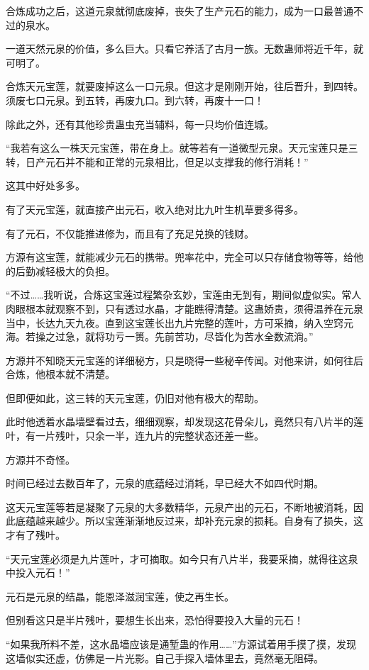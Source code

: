 \begin{this_body}
合炼成功之后，这道元泉就彻底废掉，丧失了生产元石的能力，成为一口最普通不过的泉水。

一道天然元泉的价值，多么巨大。只看它养活了古月一族。无数蛊师将近千年，就可明了。

合炼天元宝莲，就要废掉这么一口元泉。但这才是刚刚开始，往后晋升，到四转。须废七口元泉。到五转，再废九口。到六转，再废十一口！

除此之外，还有其他珍贵蛊虫充当辅料，每一只均价值连城。

“我若有这么一株天元宝莲，带在身上。就等若有一道微型元泉。天元宝莲只是三转，日产元石并不能和正常的元泉相比，但足以支撑我的修行消耗！”

这其中好处多多。

有了天元宝莲，就直接产出元石，收入绝对比九叶生机草要多得多。

有了元石，不仅能推进修为，而且有了充足兑换的钱财。

方源有这宝莲，就能减少元石的携带。兜率花中，完全可以只存储食物等等，给他的后勤减轻极大的负担。

“不过……我听说，合炼这宝莲过程繁杂玄妙，宝莲由无到有，期间似虚似实。常人肉眼根本就观察不到，只有透过水晶，才能瞧得清楚。这蛊娇贵，须得温养在元泉当中，长达九天九夜。直到这宝莲长出九片完整的莲叶，方可采摘，纳入空窍元海。若操之过急，就将功亏一篑。先前苦功，尽皆化为苦水全数流淌。”

方源并不知晓天元宝莲的详细秘方，只是晓得一些秘辛传闻。对他来讲，如何往后合炼，他根本就不清楚。

但即便如此，这三转的天元宝莲，仍旧对他有极大的帮助。

此时他透着水晶墙壁看过去，细细观察，却发现这花骨朵儿，竟然只有八片半的莲叶，有一片残叶，只余一半，连九片的完整状态还差一些。

方源并不奇怪。

时间已经过去数百年了，元泉的底蕴经过消耗，早已经大不如四代时期。

这天元宝莲等若是凝聚了元泉的大多数精华，元泉产出的元石，不断地被消耗，因此底蕴越来越少。所以宝莲渐渐地反过来，却补充元泉的损耗。自身有了损失，这才有了残叶。

“天元宝莲必须是九片莲叶，才可摘取。如今只有八片半，我要采摘，就得往这泉中投入元石！”

元石是元泉的结晶，能恩泽滋润宝莲，使之再生长。

但别看这只是半片残叶，要想生长出来，恐怕得要投入大量的元石！

“如果我所料不差，这水晶墙应该是通堑蛊的作用……”方源试着用手摸了摸，发现这墙似实还虚，仿佛是一片光影。自己手探入墙体里去，竟然毫无阻碍。


\end{this_body}
